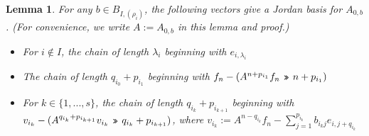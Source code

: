 \documentclass[12pt,psamsfonts]{article}
\newcommand{\leftshift}{\,\texttt{<<}\,}
\newcommand{\rightshift}{\mathbin{\rotatebox[origin=c]{180}{\leftshift}}}
\newtheorem{lemma}[theorem]{Lemma}
\begin{document}
\begin{lemma}\label{jordan_basis}
    For any \(b \in B_{I, (\rho_i)}\), the following vectors give a Jordan basis for \(A_{0,b}\).
    (For convenience, we write \(A := A_{0,b}\) in this lemma and proof.)
    \begin{itemize}
        \item For \(i \notin I\), the chain of length \(\lambda_i\) beginning with \(e_{i, \lambda_i}\)
        \item The chain of length \(q_{i_0} + p_{i_1}\) beginning with \(f_n - (A^{n + p_{i_1}}f_n \rightshift n + p_{i_1})\)
        \item For \(k \in \{1, ..., s\}\), the chain of length \(q_{i_k} + p_{i_{k + 1}}\) beginning with \(v_{i_k} - (A^{q_{i_k} + p_{i_{k + 1}}} v_{i_k} \rightshift q_{i_k} + p_{i_{k + 1}})\), where \(v_{i_k} := A^{n - q_{i_k}} f_n - \sum_{j = 1}^{p_{i_k}} b_{i_kj} e_{i,j + q_{i_k}}\)
    \end{itemize}
\end{lemma}
\end{document}
